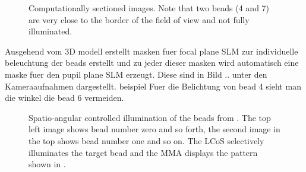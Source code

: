 \begin{figure}[hbtp]
  \centering
  \caption{Computationally sectioned images. Note that two beads (4
    and 7) are very close to the border of the field of view and not
    fully illuminated.}
  \label{fig:m_sec}
\end{figure}

Ausgehend vom 3D modell erstellt masken fuer focal plane SLM zur individuelle
beleuchtung der beads erstellt und zu jeder dieser masken wird
automatisch eine maske fuer den pupil plane SLM erzeugt. Diese sind in
Bild .. unter den Kameraaufnahmen dargestellt. beispiel Fuer die Belichtung von
bead 4 sieht man die winkel die bead 6 vermeiden.



\begin{figure}[hbtp]
  \centering
  \caption{Spatio-angular controlled illumination of the beads from
    . The top left image shows bead number zero and
    so forth, the second image in the top shows bead number one and so
    on. The LCoS selectively illuminates the target bead and the MMA
    displays the pattern shown in .}
  \label{fig:m_ang}
\end{figure}


\begin{figure}[!hbt]
  \centering
  \caption{}
  \label{fig:montage-ang}
\end{figure}




